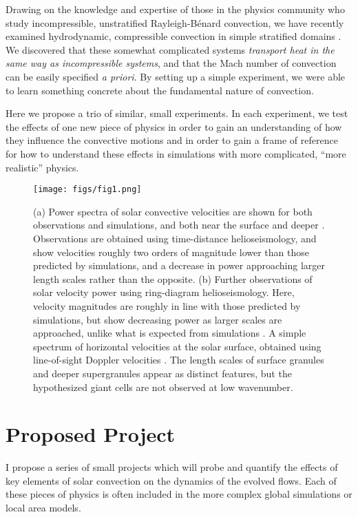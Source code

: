 \documentclass[aasms,12pt]{article}
\newcommand{\RB}{Rayleigh-B\'{e}nard }
\begin{document}
Drawing on the knowledge and expertise of those in the physics community who study incompressible,
unstratified \RB convection, we have recently examined hydrodynamic, compressible convection
in simple stratified domains \cite{anders&brown2017}.  We discovered that these somewhat complicated systems
\emph{transport heat in the same way as incompressible systems}, and that the Mach number of
convection can be easily specified \emph{a priori}.  By setting up a simple experiment, we
were able to learn something concrete about the fundamental nature of convection.  

Here we propose a trio of similar, small experiments.  In each experiment, we test the effects
of one new piece of physics in order to gain an understanding of how they influence the convective
motions and in order to gain a frame of reference for how to understand these effects in 
simulations with more complicated, ``more realistic'' physics.


\begin{figure}[t]
\centering
\texttt{[image: figs/fig1.png]}
\caption{(a) Power spectra of solar convective velocities are shown for both observations and simulations,
and both near the surface and deeper \cite{hanasoge&all2012}.  Observations are obtained
using time-distance helioseismology, and show velocities roughly two orders of magnitude lower
than those predicted by simulations, and a decrease in power approaching larger length
scales rather than the opposite. (b) Further observations of solar velocity power  using
ring-diagram helioseismology.  Here, velocity magnitudes are roughly in line with those
predicted by simulations, but show decreasing power as larger scales are approached, unlike
what is expected from simulations \cite{greer&all2015}.  A simple spectrum of horizontal
velocities at the solar surface, obtained using line-of-sight Doppler velocities \cite{hathaway&all2015}.
The length scales of surface granules and deeper supergranules appear as distinct features, but
the hypothesized giant cells are not observed at low wavenumber.
        \label{fig:fig1}}
\end{figure}

\section{Proposed Project}
I propose a series of small projects which will probe and quantify the effects of key
elements of solar convection on the dynamics of the evolved flows.  Each of these pieces
of physics is often included in the more complex global simulations or local area models.
\end{document}
